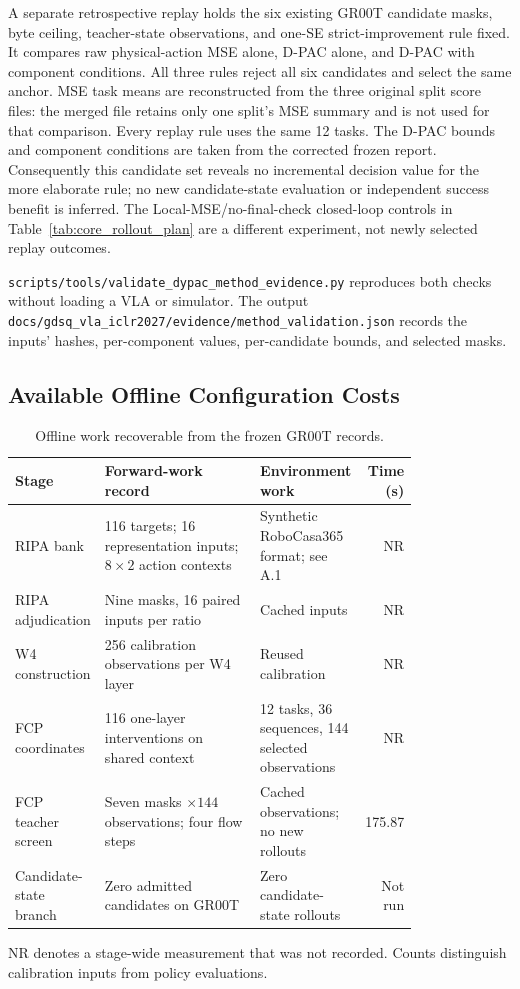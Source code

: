 A separate retrospective replay holds the six existing GR00T candidate masks, byte ceiling, teacher-state observations, and one-SE strict-improvement rule fixed. It compares raw physical-action MSE alone, D-PAC alone, and D-PAC with component conditions. All three rules reject all six candidates and select the same anchor. MSE task means are reconstructed from the three original split score files: the merged file retains only one split's MSE summary and is not used for that comparison. Every replay rule uses the same 12 tasks. The D-PAC bounds and component conditions are taken from the corrected frozen report. Consequently this candidate set reveals no incremental decision value for the more elaborate rule; no new candidate-state evaluation or independent success benefit is inferred. The Local-MSE/no-final-check closed-loop controls in Table~\ref{tab:core_rollout_plan} are a different experiment, not newly selected replay outcomes.

\nolinkurl{scripts/tools/validate_dypac_method_evidence.py} reproduces both checks without loading a VLA or simulator. The output \nolinkurl{docs/gdsq_vla_iclr2027/evidence/method_validation.json} records the inputs' hashes, per-component values, per-candidate bounds, and selected masks.

\subsection{Available Offline Configuration Costs}
\label{sec:offline_cost}

\begin{table}[t]
\centering
\caption{Offline work recoverable from the frozen GR00T records.}
\label{tab:offline_cost}
\footnotesize
\begin{tabular}{@{}p{0.17\linewidth}p{0.40\linewidth}p{0.23\linewidth}r@{}}
\toprule
Stage & Forward-work record & Environment work & Time (s) \\
\midrule
RIPA bank & 116 targets; 16 representation inputs; $8\times2$ action contexts & Synthetic RoboCasa365 format; see A.1 & NR \\
RIPA adjudication & Nine masks, 16 paired inputs per ratio & Cached inputs & NR \\
W4 construction & 256 calibration observations per W4 layer & Reused calibration & NR \\
FCP coordinates & 116 one-layer interventions on shared context & 12 tasks, 36 sequences, 144 selected observations & NR \\
FCP teacher screen & Seven masks $\times144$ observations; four flow steps & Cached observations; no new rollouts & 175.87 \\
Candidate-state branch & Zero admitted candidates on GR00T & Zero candidate-state rollouts & Not run \\
\bottomrule
\end{tabular}
\vspace{2pt}
\parbox{0.99\linewidth}{\footnotesize NR denotes a stage-wide measurement that was not recorded. Counts distinguish calibration inputs from policy evaluations.}
\end{table}

